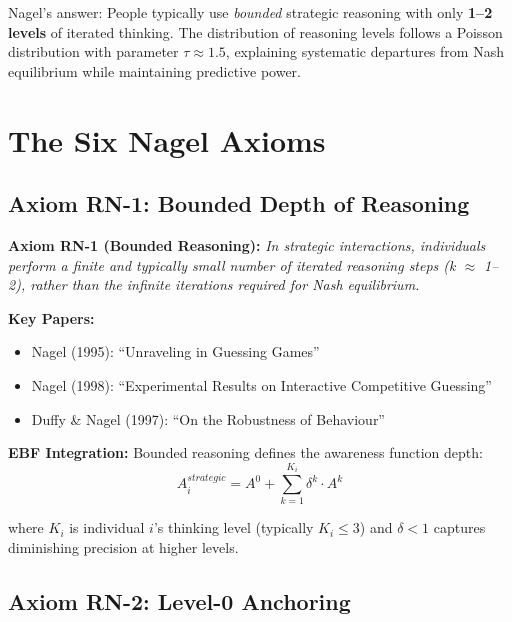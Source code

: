 Nagel's answer: People typically use \textit{bounded} strategic reasoning with only \textbf{1--2 levels} of iterated thinking. The distribution of reasoning levels follows a Poisson distribution with parameter $\tau \approx 1.5$, explaining systematic departures from Nash equilibrium while maintaining predictive power.

\section{The Six Nagel Axioms}

\subsection{Axiom RN-1: Bounded Depth of Reasoning}

\begin{tcolorbox}[colback=blue!5!white, colframe=blue!75!black]
\textbf{Axiom RN-1 (Bounded Reasoning):}
\textit{In strategic interactions, individuals perform a finite and typically small number of iterated reasoning steps (k $\approx$ 1--2), rather than the infinite iterations required for Nash equilibrium.}
\end{tcolorbox}

\textbf{Key Papers:}
\begin{itemize}[nosep]
    \item Nagel (1995): ``Unraveling in Guessing Games''
    \item Nagel (1998): ``Experimental Results on Interactive Competitive Guessing''
    \item Duffy \& Nagel (1997): ``On the Robustness of Behaviour''
\end{itemize}

\textbf{EBF Integration:}
Bounded reasoning defines the awareness function depth:
\begin{equation}
A^{strategic}_i = A^0 + \sum_{k=1}^{K_i} \delta^k \cdot A^k
\end{equation}

where $K_i$ is individual $i$'s thinking level (typically $K_i \leq 3$) and $\delta < 1$ captures diminishing precision at higher levels.

\subsection{Axiom RN-2: Level-0 Anchoring}

